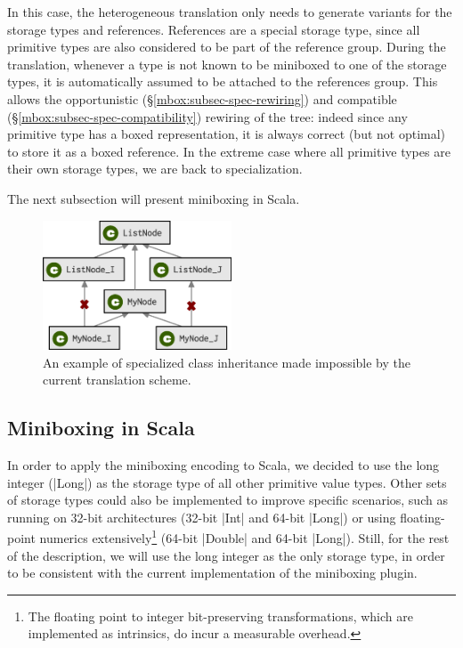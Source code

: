 In this case, the heterogeneous translation only needs to generate variants for the storage types and references. References are a special storage type, since all primitive types are also considered to be part of the reference group. During the translation, whenever a type is not known to be miniboxed to one of the storage types, it is automatically assumed to be attached to the references group. This allows the opportunistic (\S\ref{mbox:subsec-spec-rewiring}) and compatible (\S\ref{mbox:subsec-spec-compatibility}) rewiring of the tree: indeed since any primitive type has a boxed representation, it is always correct (but not optimal) to store it as a boxed reference. In the extreme case where all primitive types are their own storage types, we are back to specialization.

The next subsection will present miniboxing in Scala.

\begin{figure}[t!]
    \centering
    \includegraphics[width=0.50\textwidth]{diags/spec-multi.eps}

    \caption[Specialization inheritance diagram]{An example of specialized class inheritance made impossible by the current translation scheme.}
    \label{mbox:fig-spec-multi}

\end{figure}

\subsection{Miniboxing in Scala}

In order to apply the miniboxing encoding to Scala, we decided to use the long integer (|Long|) as the storage type of all other primitive value types. Other sets of storage types could also be implemented to improve specific scenarios, such as running on 32-bit architectures (32-bit |Int| and 64-bit |Long|) or using floating-point numerics extensively\footnote{The floating point to integer bit-preserving transformations, which are implemented as intrinsics, do incur a measurable overhead.} (64-bit |Double| and 64-bit |Long|). Still, for the rest of the description, we will use the long integer as the only storage type, in order to be consistent with the current implementation of the miniboxing plugin.

